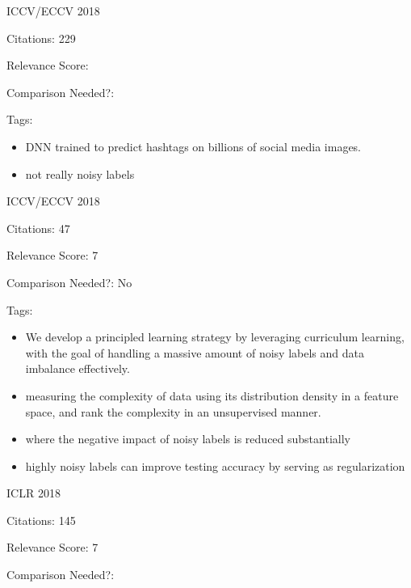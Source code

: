 \documentclass[11pt]{article}
\begin{document}
\vspace{2cm}

\noindent ICCV/ECCV 2018

\noindent Citations: 229

\noindent Relevance Score:

\noindent Comparison Needed?: 

\noindent Tags:

\begin{itemize}
\item DNN trained to predict hashtags on billions of social media images.
\item not really noisy labels
\end{itemize}

\vspace{2cm}

\noindent ICCV/ECCV 2018

\noindent Citations: 47

\noindent Relevance Score: 7

\noindent Comparison Needed?: No

\noindent Tags:

\begin{itemize}
\item We develop a principled learning strategy by leveraging curriculum learning, with the goal of handling a massive amount of noisy labels and data imbalance effectively.
\item measuring the complexity of data using its distribution density in a feature space, and rank the complexity in an unsupervised manner.
\item where the negative impact of noisy labels is reduced substantially
\item highly noisy labels can improve testing accuracy by serving as regularization
\end{itemize}

\vspace{2cm}

\noindent ICLR 2018

\noindent Citations: 145

\noindent Relevance Score: 7

\noindent Comparison Needed?: 
\end{document}
